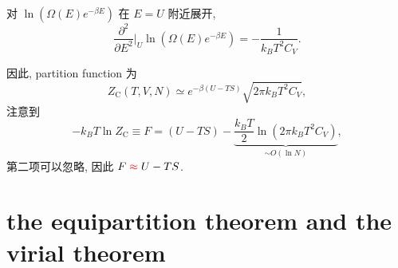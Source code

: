 \begin{itemize}
	\begin{tcolorbox}[title=calculation:]
		对 $\ln(\Omega(E) e^{- \beta E})$ 在 $E = U$ 附近展开,
		\begin{equation}
			\frac{\partial^2}{\partial E^2} \Big|_U \ln(\Omega(E) e^{- \beta E}) = - \frac{1}{k_B T^2 C_V}.
		\end{equation}
	\end{tcolorbox}
	
	因此, partition function 为
	\begin{equation}
		Z_\text{C}(T, V, N) \simeq e^{- \beta (U - T S)} \sqrt{2 \pi k_B T^2 C_V},
	\end{equation}
	注意到
	\begin{equation}
		- k_B T \ln Z_\text{C} \equiv F = (U - T S) - \underbrace{\frac{k_B T}{2} \ln(2 \pi k_B T^2 C_V)}_{\sim O(\ln N)},
	\end{equation}
	第二项可以忽略, 因此 $F \mathcolor{red}{\approx} U - T S$.
\end{itemize}

\section{the equipartition theorem and the virial theorem}
